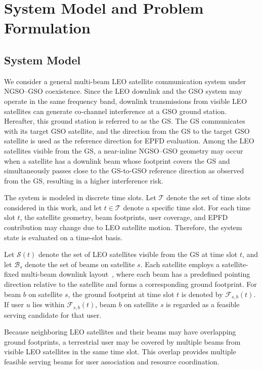 

\section{System Model and Problem Formulation}
\label{sec:system_model}

\subsection{System Model}

We consider a general multi-beam LEO satellite communication system under NGSO--GSO coexistence. Since the LEO downlink and the GSO system may operate in the same frequency band, downlink transmissions from visible LEO satellites can generate co-channel interference at a GSO ground station. Hereafter, this ground station is referred to as the GS. The GS communicates with its target GSO satellite, and the direction from the GS to the target GSO satellite is used as the reference direction for EPFD evaluation. Among the LEO satellites visible from the GS, a near-inline NGSO--GSO geometry may occur when a satellite has a downlink beam whose footprint covers the GS and simultaneously passes close to the GS-to-GSO reference direction as observed from the GS, resulting in a higher interference risk.

The system is modeled in discrete time slots. Let $\mathcal{T}$ denote the set of time slots considered in this work, and let $t\in\mathcal{T}$ denote a specific time slot. For each time slot $t$, the satellite geometry, beam footprints, user coverage, and EPFD contribution may change due to LEO satellite motion. Therefore, the system state is evaluated on a time-slot basis.

Let $\mathcal{S}(t)$ denote the set of LEO satellites visible from the GS at time slot $t$, and let $\mathcal{B}_s$ denote the set of beams on satellite $s$. Each satellite employs a satellite-fixed multi-beam downlink layout~\cite{lei2011multibeam}, where each beam has a predefined pointing direction relative to the satellite and forms a corresponding ground footprint. For beam $b$ on satellite $s$, the ground footprint at time slot $t$ is denoted by $\mathcal{F}_{s,b}(t)$. If user $u$ lies within $\mathcal{F}_{s,b}(t)$, beam $b$ on satellite $s$ is regarded as a feasible serving candidate for that user.

Because neighboring LEO satellites and their beams may have overlapping ground footprints, a terrestrial user may be covered by multiple beams from visible LEO satellites in the same time slot. This overlap provides multiple feasible serving beams for user association and resource coordination.

